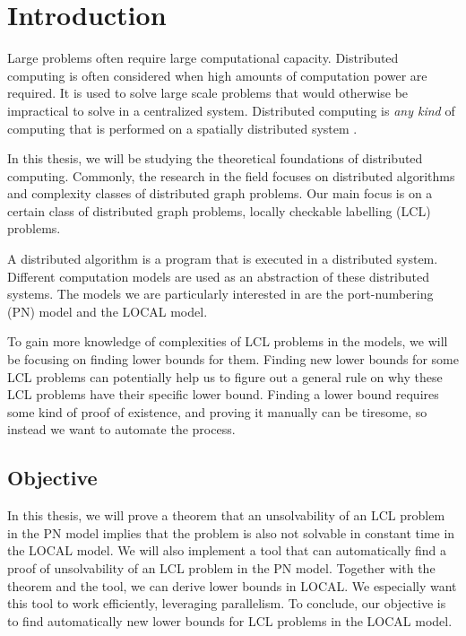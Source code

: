 
\section{Introduction}  \label{sec:introduction}

Large problems often require large computational capacity.
Distributed computing is often considered when high amounts of computation power are required.
It is used to solve large scale problems that would otherwise be impractical to solve in a centralized system.
Distributed computing is \emph{any kind} of computing that is performed on a spatially distributed system
\cite{DBLP:books/el/leeuwen90/LamportL90}.

In this thesis, we will be studying the theoretical foundations of distributed computing.
Commonly, the research in the field focuses on distributed algorithms and complexity classes of distributed graph problems.
Our main focus is on a certain class of distributed graph problems, locally checkable labelling (LCL) problems.

A distributed algorithm is a program that is executed in a distributed system.
Different computation models are used as an abstraction of these distributed systems.
The models we are particularly interested in are the port-numbering (PN) model and the LOCAL model.


To gain more knowledge of complexities of LCL problems in the models, we will be focusing on finding lower bounds for them.
Finding new lower bounds for some LCL problems can potentially help us to figure out a general rule on why these LCL problems have their specific lower bound.
Finding a lower bound requires some kind of proof of existence, and proving it manually can be tiresome, so instead we want to automate the process.

\subsection{Objective}
In this thesis, we will prove a theorem that an unsolvability of an LCL problem in the PN model implies that the problem is also not solvable in constant time in the LOCAL model.
We will also implement a tool that can automatically find a proof of unsolvability of an LCL problem in the PN model.
Together with the theorem and the tool, we can derive lower bounds in LOCAL.
We especially want this tool to work efficiently, leveraging parallelism.
To conclude, our objective is to find automatically new lower bounds for LCL problems in the LOCAL model.

